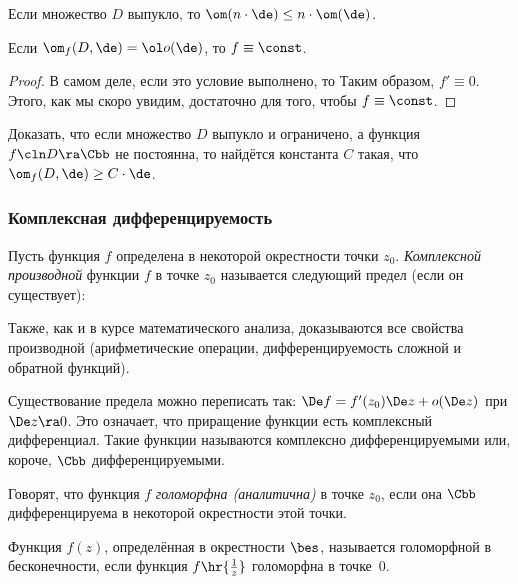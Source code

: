 \documentclass[a4paper]{article}
\begin{document}
\begin{imp}
Если множество $D$ выпукло, то $\om(n\cdot \de) \le n\cdot \om(\de)$.
\end{imp}

\begin{imp}
Если $\om_f(D,\de) = \ol o(\de)$, то $f\equiv \const$.
\end{imp}
\begin{proof}
В самом деле, если это условие выполнено, то
Таким образом, $f' \equiv 0$. Этого, как мы скоро увидим, достаточно для того,
чтобы $f \equiv \const$.
\end{proof}

\begin{problem}
Доказать, что если множество $D$ выпукло и ограничено, а функция $f\cln D\ra\Cbb$ не постоянна, то найдётся
константа $C$ такая, что $\om_f(D,\de) \ge C\cdot \de$.
\end{problem}

\subsubsection{Комплексная дифференцируемость}

\begin{df}
Пусть функция $f$ определена в некоторой окрестности точки $z_0$.
\emph{Комплексной производной} функции $f$ в точке $z_0$ называется следующий предел (если он существует):
\end{df}

Также, как и в курсе математического анализа, доказываются все свойства производной (арифметические операции,
дифференцируемость сложной и обратной функций).

Существование предела можно переписать так: $\De f = f'(z_0 )\De z + o(\De z)$ при $\De z \ra 0$. Это означает, что
приращение функции есть комплексный дифференциал. Такие функции называются комплексно дифференцируемыми или, короче,
$\Cbb$ дифференцируемыми.

\begin{df}
Говорят, что функция $f$ \emph{голоморфна (аналитична)} в точке $z_0$, если она $\Cbb$ дифференцируема
в некоторой окрестности этой точки.
\end{df}

\begin{df}
Функция $f(z)$, определённая в окрестности $\bes$, называется голоморфной в бесконечности, если функция
$f\hr{\frac1z}$ голоморфна в точке~$0$.
\end{df}
\end{document}
